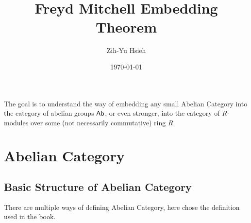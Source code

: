 \documentclass{article}
\title{Freyd Mitchell Embedding Theorem}
\author{Zih-Yu Hsieh}
\date{\today}
\begin{document}
\maketitle

The goal is to understand the way of embedding any small Abelian Category into the category of abelian groups $\mathsf{Ab}$, or even stronger, into the category of $R$-modules over some (not necessarily commutative) ring $R$.

\section{Abelian Category}

\subsection{Basic Structure of Abelian Category}
There are multiple ways of defining Abelian Category, here chose the definition used in the book.
\end{document}

